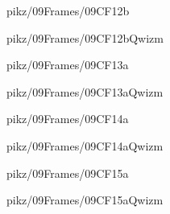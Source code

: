 \documentclass[9pt,xcolor={svgnames, x11names}]{beamer}
\begin{document}

\begin{frame}{pikz/09Frames/09CF12b}
  
\end{frame}


\begin{frame}{pikz/09Frames/09CF12bQwizm}
  
\end{frame}


\begin{frame}{pikz/09Frames/09CF13a}
  
\end{frame}


\begin{frame}{pikz/09Frames/09CF13aQwizm}
  
\end{frame}


\begin{frame}{pikz/09Frames/09CF14a}
  
\end{frame}


\begin{frame}{pikz/09Frames/09CF14aQwizm}
  
\end{frame}


\begin{frame}{pikz/09Frames/09CF15a}
  
\end{frame}


\begin{frame}{pikz/09Frames/09CF15aQwizm}
  
\end{frame}
\end{document}
